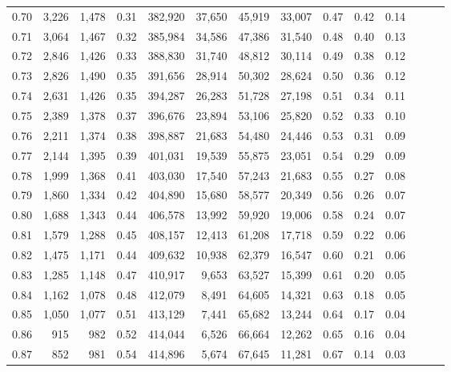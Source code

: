 \begin{tabular}{rrrrrrrrrrrrrr}
0.70 &   3,226 &  1,478 &  0.31 &  382,920 &   37,650 &  45,919 &  33,007 &  0.47 &  0.42 &      0.14 \\
0.71 &   3,064 &  1,467 &  0.32 &  385,984 &   34,586 &  47,386 &  31,540 &  0.48 &  0.40 &      0.13 \\
0.72 &   2,846 &  1,426 &  0.33 &  388,830 &   31,740 &  48,812 &  30,114 &  0.49 &  0.38 &      0.12 \\
0.73 &   2,826 &  1,490 &  0.35 &  391,656 &   28,914 &  50,302 &  28,624 &  0.50 &  0.36 &      0.12 \\
0.74 &   2,631 &  1,426 &  0.35 &  394,287 &   26,283 &  51,728 &  27,198 &  0.51 &  0.34 &      0.11 \\
0.75 &   2,389 &  1,378 &  0.37 &  396,676 &   23,894 &  53,106 &  25,820 &  0.52 &  0.33 &      0.10 \\
0.76 &   2,211 &  1,374 &  0.38 &  398,887 &   21,683 &  54,480 &  24,446 &  0.53 &  0.31 &      0.09 \\
0.77 &   2,144 &  1,395 &  0.39 &  401,031 &   19,539 &  55,875 &  23,051 &  0.54 &  0.29 &      0.09 \\
0.78 &   1,999 &  1,368 &  0.41 &  403,030 &   17,540 &  57,243 &  21,683 &  0.55 &  0.27 &      0.08 \\
0.79 &   1,860 &  1,334 &  0.42 &  404,890 &   15,680 &  58,577 &  20,349 &  0.56 &  0.26 &      0.07 \\
0.80 &   1,688 &  1,343 &  0.44 &  406,578 &   13,992 &  59,920 &  19,006 &  0.58 &  0.24 &      0.07 \\
0.81 &   1,579 &  1,288 &  0.45 &  408,157 &   12,413 &  61,208 &  17,718 &  0.59 &  0.22 &      0.06 \\
0.82 &   1,475 &  1,171 &  0.44 &  409,632 &   10,938 &  62,379 &  16,547 &  0.60 &  0.21 &      0.06 \\
0.83 &   1,285 &  1,148 &  0.47 &  410,917 &    9,653 &  63,527 &  15,399 &  0.61 &  0.20 &      0.05 \\
0.84 &   1,162 &  1,078 &  0.48 &  412,079 &    8,491 &  64,605 &  14,321 &  0.63 &  0.18 &      0.05 \\
0.85 &   1,050 &  1,077 &  0.51 &  413,129 &    7,441 &  65,682 &  13,244 &  0.64 &  0.17 &      0.04 \\
0.86 &     915 &    982 &  0.52 &  414,044 &    6,526 &  66,664 &  12,262 &  0.65 &  0.16 &      0.04 \\
0.87 &     852 &    981 &  0.54 &  414,896 &    5,674 &  67,645 &  11,281 &  0.67 &  0.14 &      0.03 \\

\end{tabular}

